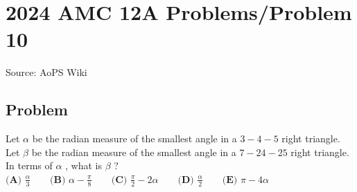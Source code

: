 \documentclass[12pt]{article}
\begin{document}
\section*{{2024 AMC 12A Problems/Problem 10}}
Source: AoPS Wiki

\subsection*{Problem}
Let $\alpha$ be the radian measure of the smallest angle in a $3{-}4{-}5$ right triangle. Let $\beta$ be the radian measure of the smallest angle in a $7{-}24{-}25$ right triangle. In terms of $\alpha$ , what is $\beta$ ? $\textbf{(A) }\frac{\alpha}{3}\qquad \textbf{(B) }\alpha - \frac{\pi}{8}\qquad \textbf{(C) }\frac{\pi}{2} - 2\alpha \qquad \textbf{(D) }\frac{\alpha}{2}\qquad \textbf{(E) }\pi - 4\alpha\qquad$
\end{document}
